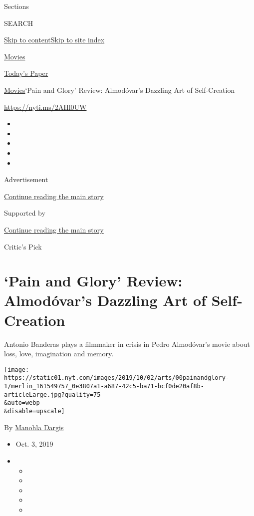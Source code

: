 Sections

SEARCH

\protect\hyperlink{site-content}{Skip to
content}\protect\hyperlink{site-index}{Skip to site index}

\href{https://www.nytimes.com/section/movies}{Movies}

\href{https://myaccount.nytimes.com/auth/login?response_type=cookie\&client_id=vi}{}

\href{https://www.nytimes.com/section/todayspaper}{Today's Paper}

\href{/section/movies}{Movies}\textbar{}`Pain and Glory' Review:
Almodóvar's Dazzling Art of Self-Creation

\href{https://nyti.ms/2AHl0UW}{https://nyti.ms/2AHl0UW}

\begin{itemize}
\item
\item
\item
\item
\item
\end{itemize}

Advertisement

\protect\hyperlink{after-top}{Continue reading the main story}

Supported by

\protect\hyperlink{after-sponsor}{Continue reading the main story}

Critic's Pick

\hypertarget{pain-and-glory-review-almoduxf3vars-dazzling-art-of-self-creation}{%
\section{`Pain and Glory' Review: Almodóvar's Dazzling Art of
Self-Creation}\label{pain-and-glory-review-almoduxf3vars-dazzling-art-of-self-creation}}

Antonio Banderas plays a filmmaker in crisis in Pedro Almodóvar's movie
about loss, love, imagination and memory.

\texttt{[image: https://static01.nyt.com/images/2019/10/02/arts/00painandglory-1/merlin\_161549757\_0e3807a1-a687-42c5-ba71-bcf0de20af8b-articleLarge.jpg?quality=75\\\&auto=webp\\\&disable=upscale]}

By \href{https://www.nytimes.com/by/manohla-dargis}{Manohla Dargis}

\begin{itemize}
\item
  Oct. 3, 2019
\item
  \begin{itemize}
  \item
  \item
  \item
  \item
  \item
  \end{itemize}
\end{itemize}


